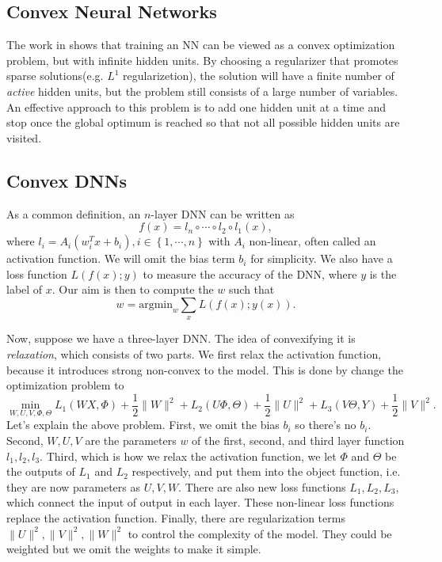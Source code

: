 \documentclass{article}
\begin{document}
\subsection{Convex Neural Networks}
The work in \cite{bengio2006convex} shows that training an NN can be viewed as a convex optimization problem, but with infinite hidden units. By choosing a regularizer that promotes sparse solutions(e.g. $L^{1}$ regularizetion), 
the solution will have a finite number of \emph{active} hidden units, but the problem still consists of a large number of variables. An effective approach to this problem is to add one hidden unit at a time and stop once the global optimum is reached so that not all possible hidden units are visited.
\subsection{Convex DNNs}
As a common definition, an $n$-layer DNN can be written as \[f(x)=l_n\circ\cdots\circ l_2\circ l_1(x),\] where $l_i=A_i(w_i^Tx+b_i),i\in\left\lbrace 1,\cdots,n\right\rbrace $ with $A_i$ non-linear, often called an activation function. We will omit the bias term $b_i$ for simplicity. We also have a loss function $L(f(x);y)$ to measure the accuracy of the DNN, where $y$ is the label of $x$. Our aim is then to compute the $w$ such that
\[w=\text{argmin}_{w}\sum_{x}L(f(x);y(x)).\]

Now, suppose we have a three-layer DNN. The idea of convexifying it is \emph{relaxation}, which consists of two parts. We first relax the activation function, because it introduces strong non-convex to the model. This is done by change the optimization problem to
\[\min_{W,U,V,\Phi,\Theta}L_1(WX,\Phi)+\frac{1}{2}\|W\|^2+L_2(U\Phi,\Theta)+\frac{1}{2}\|U\|^2+L_3(V\Theta,Y)+\frac{1}{2}\|V\|^2.\]
Let's explain the above problem. First, we omit the bias $b_i$ so there's no $b_i$. Second, $W,U,V$ are the parameters $w$ of the first, second, and third layer function $l_1,l_2,l_3$. Third, which is how we relax the activation function, we let $\Phi$ and $\Theta$ be the outputs of $L_1$ and $L_2$ respectively, and put them into the object function, i.e. they are now parameters as $U,V,W$. There are also new loss functions $L_1,L_2,L_3$, which connect the input of output in each layer. These non-linear loss functions replace the activation function. Finally, there are regularization terms $\|U\|^2,\|V\|^2,\|W\|^2$ to control the complexity of the model. They could be weighted but we omit the weights to make it simple.
\end{document}
